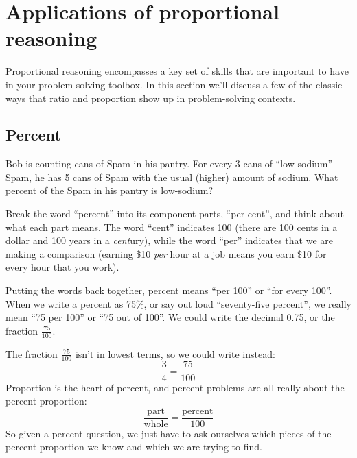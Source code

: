 \section{Applications of proportional reasoning}
\label{sec:probsolvwithprops}

Proportional reasoning encompasses a key set of skills that are important to have in your problem-solving toolbox. In this section we'll discuss a few of the classic ways that ratio and proportion show up in problem-solving contexts.

\subsection{Percent}


\begin{boxexplore}
Bob is counting cans of Spam in his pantry. For every 3 cans of ``low-sodium'' Spam, he has 5 cans of Spam with the usual (higher) amount of sodium. What percent of the Spam in his pantry is low-sodium? 
\end{boxexplore}

Break the word ``percent'' into its component parts, ``per cent'', and think about what each part means. The word ``cent'' indicates 100 (there are 100 {\em} cents in a dollar and 100 years in a \textit{cent}ury), while the word ``per'' indicates that we are making a comparison (earning \$10 \textit{per} hour at a job means you earn \$10 for every hour that you work).

Putting the words back together, percent means ``per 100'' or ``for every 100''. When we write a percent as 75\%, or say out loud ``seventy-five percent'', we really mean ``75 per 100'' or ``75 out of 100''. We could write the decimal 0.75, or the fraction $\frac{75}{100}$.

The fraction $\frac{75}{100}$ isn't in lowest terms, so we could write instead: \[\frac{3}{4} = \frac{75}{100}\]
Proportion is the heart of percent, and percent problems are all really about the percent proportion: \[\frac{\text{part}}{\text{whole}} = \frac{\text{percent}}{100}\]
So given a percent question, we just have to ask ourselves which pieces of the percent proportion we know and which we are trying to find.


